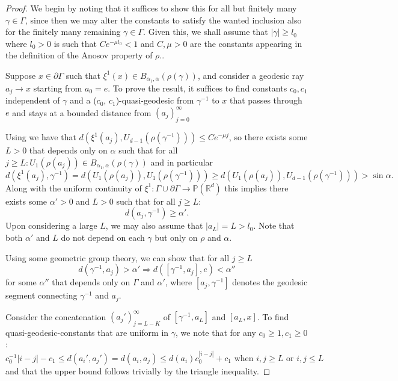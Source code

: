 \documentclass{report}
\begin{document}
\begin{proof}
    We begin by noting that it suffices to show this for all but finitely many $\gamma \in \Gamma$, since then we may alter the constants to satisfy the wanted inclusion also for the finitely many remaining $\gamma \in \Gamma$. Given this, we shall assume that $|\gamma| \geq l_0$ where $l_0 > 0$ is such that $Ce^{-\mu l_0} < 1$ and $C, \mu > 0$ are the constants appearing in the definition of the Anosov property of $\rho$..

    Suppose $x \in \partial \Gamma$ such that $\xi^1(x) \in B_{\alpha_1, \alpha}(\rho(\gamma))$, and consider a geodesic ray $a_j \to x$ starting from $a_0 = e$.
    To prove the result, it suffices to find constants $c_0, c_1$ independent of $\gamma$ and a ($c_0$, $c_1$)-quasi-geodesic from $\gamma^{-1}$ to $x$ that passes through $e$ and stays at a bounded distance from $(a_j)_{j=0}^\infty$

    Using \cite[Proposition 2.5]{pozzetti_anosov_2023} we have that
    $d(\xi^1(a_j), U_{d-1}(\rho(\gamma^{-1}))) \leq C e^{-\mu j}$, 
    so there exists some $L>0$ that depends only on $\alpha$ 
    such that for all $j\geq L: U_1(\rho(a_j))\in B_{\alpha_1, \alpha}(\rho(\gamma))$ and in particular
    \[
        d(\xi^1(a_j), \gamma^{-1}) = d(U_1(\rho(a_j)), U_1(\rho(\gamma^{-1}))) \geq 
        d(U_1(\rho(a_j)), U_{d-1}(\rho(\gamma^{-1}))) > \sin\alpha.
    \]
    Along with the uniform continuity of $\xi^1: \Gamma \cup \partial \Gamma \to \mathbb P(\mathbb R^d)$ this implies there exists some $\alpha' > 0$ and $L>0$ such that for all $j\geq L$:
    \[
        d(a_j, \gamma^{-1}) \geq \alpha'.
    \]
    Upon considering a large $L$, we may also assume that $|a_L| = L > l_0$. Note that both $\alpha'$ and $L$ do not depend on each $\gamma$ but only on $\rho$ and $\alpha$.

    Using some geometric group theory, we can show that for all $j \geq L$
    \[
        d(\gamma^{-1}, a_j) > \alpha' \Rightarrow
        d([\gamma^{-1}, a_j], e) < \alpha''
    \]
    for some $\alpha''$ that depends only on $\Gamma$ and $\alpha'$, where $[a_j, \gamma^{-1}]$ denotes the geodesic segment connecting $\gamma^{-1}$ and $a_j$.

    Consider the concatenation $(a_j')_{j=L-K}^\infty$ of $[\gamma^{-1},a_L]$ and $[a_L, x]$.
    To find quasi-geodesic-constants that are uniform in $\gamma$, we note that for any $c_0 \geq 1, c_1 \geq 0$:
    \[
        c_0^{-1} |i - j| - c_1 \leq d(a_i', a_j') = d(a_i, a_j) \leq d(a_i) c_0^ |i - j| + c_1 
        \text{ when } i,j \geq L \text{ or } i,j \leq L
    \]
    and that the upper bound follows trivially by the triangle inequality. 
    

\end{proof}
\end{document}
